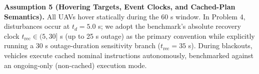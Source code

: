 \textbf{Assumption 5 (Hovering Targets, Event Clocks, and Cached-Plan Semantics).} All UAVs hover statically during the 60 s window. In Problem 4, disturbances occur at $t_d=5.0$ s; we adopt the benchmark's absolute recovery clock $t_{\mathrm{rec}}\in(5,30]$ s (up to 25 s outage) as the primary convention while explicitly running a 30 s outage-duration sensitivity branch ($t_{\mathrm{rec}}=35$ s). During blackouts, vehicles execute cached nominal instructions autonomously, benchmarked against an ongoing-only (non-cached) execution mode.
